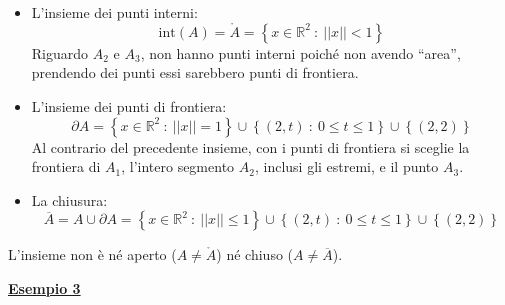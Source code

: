 \documentclass[a4paper]{article}
\newcommand{\dquotes}[1]{``#1''}
\newcommand{\example}[1]{\textcolor{Green4}{\textbf{#1}}}
\begin{document}
	\begin{itemize}
		\item L'insieme dei punti interni:
		\begin{equation*}
			\mathrm{int}\left(A\right) = \mathring{A} = \left\{x \in \mathbb{R}^{2} \: : \: || x || < 1\right\} 
		\end{equation*}
		Riguardo $A_{2}$ e $A_{3}$, non hanno punti interni poiché non avendo \dquotes{area}, prendendo dei punti essi sarebbero punti di frontiera.

		\item L'insieme dei punti di frontiera:
		\begin{equation*}
			\partial A = \left\{x \in \mathbb{R}^{2} \: : \: || x || = 1\right\} \cup \left\{\left(2,t\right) \: : \: 0 \le t \le 1\right\} \cup \left\{\left(2,2\right)\right\}
		\end{equation*}
		Al contrario del precedente insieme, con i punti di frontiera si sceglie la frontiera di $A_{1}$, l'intero segmento $A_{2}$, inclusi gli estremi, e il punto $A_{3}$.

		\item La chiusura:
		\begin{equation*}
			\overline{A} = A \cup \partial A = \left\{x \in \mathbb{R}^{2} \: : \: || x || \le 1\right\} \cup \left\{\left(2,t\right) \: : \: 0 \le t \le 1\right\} \cup \left\{\left(2,2\right)\right\}
		\end{equation*}
	\end{itemize}
	L'insieme non è né aperto ($A \ne \mathring{A}$) né chiuso ($A \ne \overline{A}$).\newpage

	\begin{flushleft}
		\example{\underline{Esempio 3}}
	\end{flushleft}
	
\end{document}
